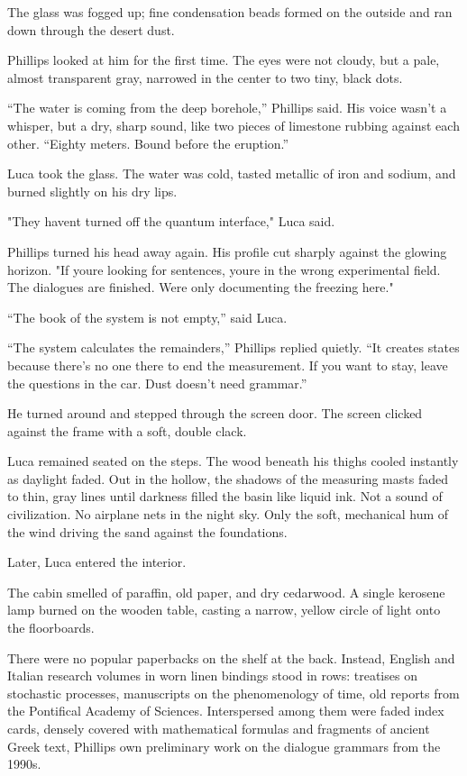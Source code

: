 \documentclass[
  ngerman,
]{article}
\begin{document}
The glass was fogged up; fine condensation beads formed on the outside
and ran down through the desert dust.

Phillips looked at him for the first time. The eyes were not cloudy, but
a pale, almost transparent gray, narrowed in the center to two tiny,
black dots.

``The water is coming from the deep borehole,'' Phillips said. His voice
wasn't a whisper, but a dry, sharp sound, like two pieces of limestone
rubbing against each other. ``Eighty meters. Bound before the
eruption.''

Luca took the glass. The water was cold, tasted metallic of iron and
sodium, and burned slightly on his dry lips.

"They haven\textquotesingle t turned off the quantum interface," Luca
said.

Phillips turned his head away again. His profile cut sharply against the
glowing horizon. "If you\textquotesingle re looking for sentences,
you\textquotesingle re in the wrong experimental field. The dialogues
are finished. We\textquotesingle re only documenting the freezing here."

``The book of the system is not empty,'' said Luca.

``The system calculates the remainders,'' Phillips replied quietly. ``It
creates states because there's no one there to end the measurement. If
you want to stay, leave the questions in the car. Dust doesn't need
grammar.''

He turned around and stepped through the screen door. The screen clicked
against the frame with a soft, double clack.

Luca remained seated on the steps. The wood beneath his thighs cooled
instantly as daylight faded. Out in the hollow, the shadows of the
measuring masts faded to thin, gray lines until darkness filled the
basin like liquid ink. Not a sound of civilization. No airplane nets in
the night sky. Only the soft, mechanical hum of the wind driving the
sand against the foundations.

Later, Luca entered the interior.

The cabin smelled of paraffin, old paper, and dry cedarwood. A single
kerosene lamp burned on the wooden table, casting a narrow, yellow
circle of light onto the floorboards.

There were no popular paperbacks on the shelf at the back. Instead,
English and Italian research volumes in worn linen bindings stood in
rows: treatises on stochastic processes, manuscripts on the
phenomenology of time, old reports from the Pontifical Academy of
Sciences. Interspersed among them were faded index cards, densely
covered with mathematical formulas and fragments of ancient Greek text,
Phillips\textquotesingle{} own preliminary work on the dialogue grammars
from the 1990s.
\end{document}
